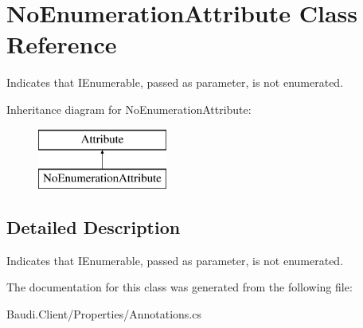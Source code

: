 \hypertarget{class_no_enumeration_attribute}{}\section{No\+Enumeration\+Attribute Class Reference}
\label{class_no_enumeration_attribute}


Indicates that I\+Enumerable, passed as parameter, is not enumerated.  


Inheritance diagram for No\+Enumeration\+Attribute\+:\begin{figure}[H]
\begin{center}
\leavevmode
\includegraphics[height=2.000000cm]{class_no_enumeration_attribute}
\end{center}
\end{figure}


\subsection{Detailed Description}
Indicates that I\+Enumerable, passed as parameter, is not enumerated. 



The documentation for this class was generated from the following file\+:\begin{DoxyCompactItemize}
\item 
Baudi.\+Client/\+Properties/Annotations.\+cs\end{DoxyCompactItemize}
